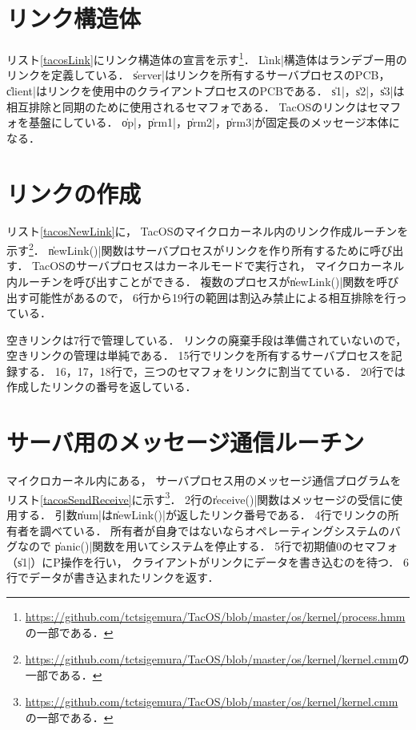 \section{リンク構造体}
リスト\ref{tacosLink}にリンク構造体の宣言を示す\footnote{
  \url{https://github.com/tctsigemura/TacOS/blob/master/os/kernel/process.hmm}
  の一部である．}．
\|Link|構造体はランデブー用のリンクを定義している．
\|server|はリンクを所有するサーバプロセスのPCB，
\|client|はリンクを使用中のクライアントプロセスのPCBである．
\|s1|，\|s2|，\|s3|は
相互排除と同期のために使用されるセマフォである．
TacOSのリンクはセマフォを基盤にしている．
\|op|，\|prm1|，\|prm2|，\|prm3|が固定長のメッセージ本体になる．



\section{リンクの作成}
リスト\ref{tacosNewLink}に，
TacOSのマイクロカーネル内のリンク作成ルーチンを示す\footnote{
  \url{https://github.com/tctsigemura/TacOS/blob/master/os/kernel/kernel.cmm}の
  一部である．}．
\|newLink()|関数はサーバプロセスがリンクを作り所有するために呼び出す．
TacOSのサーバプロセスはカーネルモードで実行され，
マイクロカーネル内ルーチンを呼び出すことができる．
複数のプロセスが\|newLink()|関数を呼び出す可能性があるので，
6行から19行の範囲は割込み禁止による相互排除を行っている．



空きリンクは7行で管理している．
リンクの廃棄手段は準備されていないので，
空きリンクの管理は単純である．
15行でリンクを所有するサーバプロセスを記録する．
16，17，18行で，三つのセマフォをリンクに割当てている．
20行では作成したリンクの番号を返している．

\section{サーバ用のメッセージ通信ルーチン}
マイクロカーネル内にある，
サーバプロセス用のメッセージ通信プログラムを
リスト\ref{tacosSendReceive}に示す\footnote{
  \url{https://github.com/tctsigemura/TacOS/blob/master/os/kernel/kernel.cmm}
  の一部である．}．
2行の\|receive()|関数はメッセージの受信に使用する．
引数\|num|は\|newLink()|が返したリンク番号である．
4行でリンクの所有者を調べている．
所有者が自身ではないならオペレーティングシステムのバグなので
\|panic()|関数を用いてシステムを停止する．
5行で初期値0のセマフォ（\|s1|）にP操作を行い，
クライアントがリンクにデータを書き込むのを待つ．
6行でデータが書き込まれたリンクを返す．

